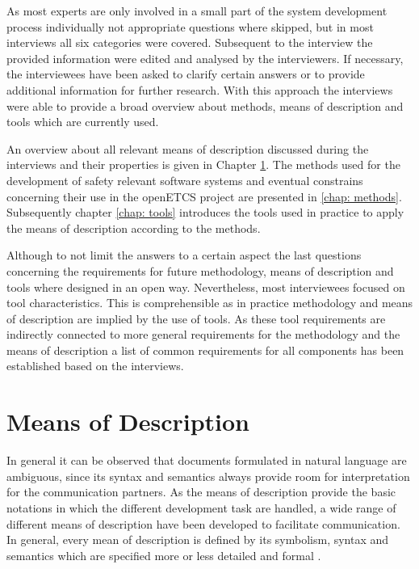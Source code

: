 \documentclass{./template/openetcs_report}
\begin{document}
As most  experts are only involved in a small part of the system development process individually not appropriate questions where skipped,  but in most interviews all six categories were covered. Subsequent to the interview the provided information were edited and analysed by the interviewers. If necessary, the interviewees have been asked to clarify certain answers or to provide additional information for further research. With this approach the interviews were able to provide a broad overview about methods, means of description and tools which are currently used.

An overview about all relevant means of description discussed during the interviews and their properties is given in Chapter \ref{chap: MoD}. The methods used for the development of safety relevant software systems and eventual constrains concerning their use in the openETCS project are presented in \ref{chap: methods}. Subsequently chapter \ref{chap: tools} introduces the tools used in practice to apply the means of description according to the methods.

Although to not limit the answers to a certain aspect the last questions concerning the requirements for future methodology, means of description and tools where designed in an open way. Nevertheless, most interviewees focused on tool characteristics. This is comprehensible as in practice  methodology and means of description are implied by the use of tools. As these tool requirements are indirectly connected to more general requirements for the methodology and the means of description a list of common requirements for all components has been established based on the interviews.

\chapter{Means of Description}

\label{chap: MoD}

In general it can be observed that documents formulated in natural language are ambiguous, since its syntax and semantics always provide room for interpretation for the communication partners. As the means of description provide the basic notations in which the different development task are handled, a wide range of different means of description have been developed to facilitate communication. In general, every mean of description is defined by its symbolism, syntax and semantics which are specified more or less detailed and formal \citep{Schnieder.2003, Schnieder.2010}.  
\end{document}
